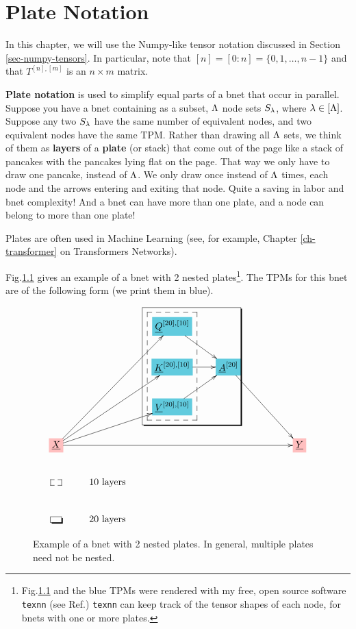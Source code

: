 \chapter{Plate Notation}
\label{ch-plates}

In this chapter, we
will use the Numpy-like tensor notation
discussed in Section 
\ref{sec-numpy-tensors}. In particular, note that $[n] = [0:n] = \{0, 1,\ldots, n-1\}$ and that $T^{[n], [m]}$ is an $n\times m$ matrix.

{\bf Plate notation} is used to simplify 
equal parts of a bnet that occur in parallel.
Suppose you have a bnet containing as a subset, $\Lambda$ node sets $S_\lambda$, where
$\lambda\in [\Lambda]$. Suppose
any two $S_\lambda$ have the same number of equivalent nodes,
and two equivalent nodes have the same TPM.
Rather than drawing all $\Lambda$ sets, 
we think of them as {\bf layers} of a {\bf plate} (or stack)
that come out of the page like a stack of pancakes with the pancakes
lying flat on the page.
That way we only have to draw one pancake, instead of $\Lambda$.
We only draw once instead of $\Lambda$ times, each node and the arrows entering and exiting
that node. Quite a saving in labor and bnet complexity! 
And a bnet can have more 
than one plate, and a node can belong
to more than one plate!

Plates are often used in Machine Learning (see, for example,
Chapter \ref{ch-transformer} on Transformers Networks).

Fig.\ref{fig-texnn-for-rock_layers}
gives an example of a bnet with 2 nested plates\footnote{Fig.\ref{fig-texnn-for-rock_layers}
and the blue TPMs were
rendered with my free, open source software 
{\tt texnn} (see Ref.\cite{texnn})
{\tt texnn} 
can keep track of 
the tensor shapes
of each node, for bnets with one or more plates.
}. 
The TPMs for this bnet are of the following
form (we print them in blue).

\begin{figure}[h!]\centering
$$\xymatrix{
&&*+[F*:SkyBlue]{\underline{Q}^{[20],[10]}}\ar[dr]&&&
\\
&&*+[F*:SkyBlue]{\underline{K}^{[20],[10]}}\ar[r]&*+[F*:SkyBlue]{\underline{A}^{[20]}}\ar[ddrr]&&
\\
&&*+[F*:SkyBlue]{\underline{V}^{[20],[10]}}\ar[ur]&&&
\\
*+[F*:pink]{\underline{X}}\ar[uurr]\ar[uuurr]\ar[urr]\ar[rrrrr]&&&&&*+[F*:pink]{\underline{Y}}
\save
\POS"1,3"."3,3"."1,3"."3,3"!C*+<1.0em>\frm{--}
\POS"1,3"."3,3"."1,4"."3,4"!C*+<2.0em>\frm{-,}
\restore
\\
*+[F--]{\;\;}&\text{$10$ layers}
\\
*+[F-,]{\;\;}&\text{$20$ layers}
}$$
\caption{Example of a bnet with 2 nested plates.  In general, multiple plates need not be 
nested.}
\label{fig-texnn-for-rock_layers}
\end{figure}

